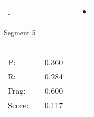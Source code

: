 \documentclass[landscape]{article}
\newcommand{\ssp}{\hspace{2pt}}
\newcommand{\mex}{\cellcolor{g}$\bullet$}
\begin{document}
\begin{tabular}{|l|p{10pt}|p{10pt}|p{10pt}|p{10pt}|p{10pt}|p{10pt}|p{10pt}|p{10pt}|p{10pt}|}
\hline
\ssp \cellcolor{ref8}. \ssp&\hspace{2pt}&\hspace{2pt}&\hspace{2pt}&\hspace{2pt}&\hspace{2pt}&\hspace{2pt}&\hspace{2pt}&\hspace{2pt}&\hspace{2pt}\mex\\
\hline
\end{tabular}

\vspace{6pt}
\noindent Segment 5\\\\
\noindent\begin{tabular}{lm{12pt}r}
\hline
P:&&0.360\\
R:&&0.284\\
Frag:&&0.600\\
Score:&&0.117\\
\end{tabular}

\newpage
\end{document}
